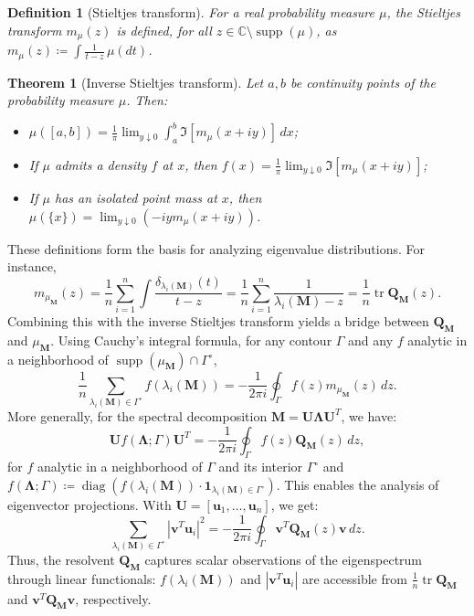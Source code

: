 \documentclass[12pt]{article}
\newtheorem{theorem}{Theorem}
\newtheorem{definition}{Definition}
\DeclareMathOperator{\tr}{tr}
\begin{document}
\begin{definition}[Stieltjes transform]
For a real probability measure $\mu$, the Stieltjes transform $m_\mu(z)$ is defined, for all $z \in \mathbb{C} \setminus \operatorname{supp}(\mu)$, as $m_\mu(z) \coloneqq \int \frac{1}{t - z} \, \mu(dt)$.
\end{definition}

\begin{theorem}[Inverse Stieltjes transform]
Let $a, b$ be continuity points of the probability measure $\mu$. Then:
\begin{itemize}
    \item $\mu([a, b]) = \frac{1}{\pi} \lim_{y \downarrow 0} \int_a^b \Im[m_\mu(x + iy)] \, dx$;
    \item If $\mu$ admits a density $f$ at $x$, then $f(x) = \frac{1}{\pi} \lim_{y \downarrow 0} \Im[m_\mu(x + iy)]$;
    \item If $\mu$ has an isolated point mass at $x$, then $\mu(\{x\}) = \lim_{y \downarrow 0} ( -iy m_\mu(x + iy))$.
\end{itemize}
\end{theorem}

These definitions form the basis for analyzing eigenvalue distributions. For instance, 
$$
m_{\mu_\mathbf{M}}(z)=\frac1n\sum_{i=1}^{n}\int\frac{\delta_{\lambda_i(\mathbf{M})}(t)}{t-z}=\frac1n\sum_{i=1}^{n}\frac{1}{\lambda_i(\mathbf{M})-z}=\frac1n\tr \mathbf{Q}_\mathbf{M}(z).
$$ 
Combining this with the inverse Stieltjes transform yields a bridge between $\mathbf{Q}_\mathbf{M}$ and $\mu_\mathbf{M}$. Using Cauchy's integral formula, for any contour $\Gamma$ and any $f$ analytic in a neighborhood of $\operatorname{supp}(\mu_\mathbf{M}) \cap \Gamma^\circ$,
$$
\frac{1}{n} \sum_{\lambda_i(\mathbf{M}) \in \Gamma^\circ} f(\lambda_i(\mathbf{M})) = -\frac{1}{2\pi i} \oint_{\Gamma} f(z) m_{\mu_{\mathbf{M}}}(z) \, dz.
$$
More generally, for the spectral decomposition $\mathbf{M} = \mathbf{U} \mathbf{\Lambda} \mathbf{U}^T$, we have:
$$
\mathbf{U}f(\mathbf{\Lambda}; \Gamma)\mathbf{U}^T = -\frac{1}{2\pi i} \oint_{\Gamma} f(z) \mathbf{Q}_\mathbf{M}(z) \, dz,
$$
for $f$ analytic in a neighborhood of $\Gamma$ and its interior $\Gamma^\circ$ and $f(\mathbf{\mathbf{\Lambda}}; \Gamma) \coloneqq \operatorname{diag}(f(\lambda_i(\mathbf{M})) \cdot \mathbf{1}_{\lambda_i(\mathbf{M}) \in \Gamma^\circ})$. This enables the analysis of eigenvector projections. With $\mathbf{U} = [\mathbf{u}_1, \ldots, \mathbf{u}_n]$, we get:
$$
\sum_{\lambda_i(\mathbf{M}) \in \Gamma^\circ} |\mathbf{v}^T \mathbf{u}_i|^2 = -\frac{1}{2\pi i} \oint_{\Gamma} \mathbf{v}^T \mathbf{Q}_\mathbf{M}(z) \mathbf{v} \, dz.
$$
Thus, the resolvent $\mathbf{Q}_\mathbf{M}$ captures scalar observations of the eigenspectrum through linear functionals: $f(\lambda_i(\mathbf{M}))$ and $|\mathbf{v}^T \mathbf{u}_i|$ are accessible from $\frac{1}{n} \tr \mathbf{Q}_\mathbf{M}$ and $\mathbf{v}^T \mathbf{Q}_\mathbf{M} \mathbf{v}$, respectively.
\end{document}
